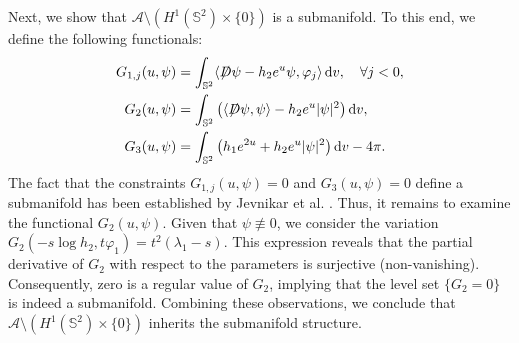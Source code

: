 \documentclass[a4paper, 12pt]{article}
\def\slashiii#1{\setbox0=\hbox{$#1$}#1\hskip-\wd0\hbox to\wd0{\hss\sl/\/\hss}}
\begin{document}
Next, we show that $\mathcal{A} \setminus \left( H^1(\mathbb{S}^2) \times \{0\} \right)$ is a submanifold. To this end, we define the following functionals:$$\begin{aligned}
	G_{1,j}(u,\psi) &= \int_{\mathbb{S}^2} \langle \slashiii{D}\psi - h_2 e^u \psi, \varphi_j \rangle \, \text{d}v, \quad \forall j < 0, \\
	G_2(u,\psi) &= \int_{\mathbb{S}^2} \left( \langle \slashiii{D}\psi, \psi \rangle - h_2 e^u |\psi|^2 \right) \text{d}v, \\
	G_3(u,\psi) &= \int_{\mathbb{S}^2} \left( h_1 e^{2u} + h_2 e^u |\psi|^2 \right) \text{d}v - 4\pi.
\end{aligned}$$The fact that the constraints $G_{1,j}(u,\psi) = 0$ and $G_3(u,\psi) = 0$ define a submanifold has been established by Jevnikar et al. \cite{MR4206467}. Thus, it remains to examine the functional $G_2(u,\psi)$. Given that $\psi \not\equiv 0$, we consider the variation $G_2(-s \log h_2, t\varphi_1) = t^2(\lambda_1 - s)$. This expression reveals that the partial derivative of $G_2$ with respect to the parameters is surjective (non-vanishing). Consequently, zero is a regular value of $G_2$, implying that the level set $\{G_2 = 0\}$ is indeed a submanifold. Combining these observations, we conclude that $\mathcal{A} \setminus \left( H^1(\mathbb{S}^2) \times \{0\} \right)$ inherits the submanifold structure.


\end{document}
